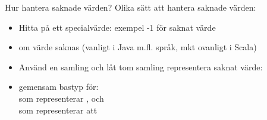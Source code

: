 


\ifkompendium\else

{
\begin{frame}[plain]
    \color{white}{Inkapsling av speciella värden så att krasch kan undvikas}
\end{frame}
}
\fi


\begin{Slide}{Hur hantera saknade värden?}\SlideFontSmall
Olika sätt att hantera saknade värden:
\begin{itemize}
\item Hitta på ett specialvärde: exempel -1 för saknat värde
\item {} om värde saknas (vanligt i Java m.fl. språk, mkt ovanligt i Scala)
\item Använd en samling och låt tom samling representera saknat värde: \\

\item {} gemensam bastyp för: \\
   som representerar , och \\  som representerar att 
\end{itemize}
\end{Slide}



